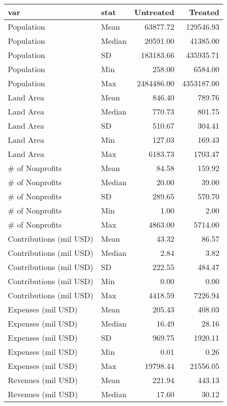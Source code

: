 \begin{table}[ht]
\centering
\begin{tabular}{llrr}
  \hline
var & stat & Untreated & Treated \\ 
  \hline
Population & Mean & 63877.72 & 129546.93 \\ 
  Population & Median & 20591.00 & 41385.00 \\ 
  Population & SD & 183183.66 & 435935.71 \\ 
  Population & Min & 258.00 & 6584.00 \\ 
  Population & Max & 2484486.00 & 4353187.00 \\ 
  Land Area & Mean & 846.40 & 789.76 \\ 
  Land Area & Median & 770.73 & 801.75 \\ 
  Land Area & SD & 510.67 & 304.41 \\ 
  Land Area & Min & 127.03 & 169.43 \\ 
  Land Area & Max & 6183.73 & 1703.47 \\ 
  \# of Nonprofits & Mean & 84.58 & 159.92 \\ 
  \# of Nonprofits & Median & 20.00 & 39.00 \\ 
  \# of Nonprofits & SD & 289.65 & 570.70 \\ 
  \# of Nonprofits & Min & 1.00 & 2.00 \\ 
  \# of Nonprofits & Max & 4863.00 & 5714.00 \\ 
  Contributions (mil USD) & Mean & 43.32 & 86.57 \\ 
  Contributions (mil USD) & Median & 2.84 & 3.82 \\ 
  Contributions (mil USD) & SD & 222.55 & 484.47 \\ 
  Contributions (mil USD) & Min & 0.00 & 0.00 \\ 
  Contributions (mil USD) & Max & 4418.59 & 7226.94 \\ 
  Expenses (mil USD) & Mean & 205.43 & 408.03 \\ 
  Expenses (mil USD) & Median & 16.49 & 28.16 \\ 
  Expenses (mil USD) & SD & 969.75 & 1920.11 \\ 
  Expenses (mil USD) & Min & 0.01 & 0.26 \\ 
  Expenses (mil USD) & Max & 19798.44 & 21556.05 \\ 
  Revenues (mil USD) & Mean & 221.94 & 443.13 \\ 
  Revenues (mil USD) & Median & 17.60 & 30.12 \\ 

\end{tabular}
\end{table}
